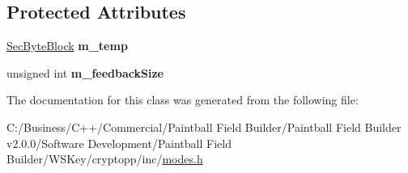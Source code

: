\subsection*{Protected Attributes}
\begin{DoxyCompactItemize}
\item 
\hypertarget{class_c_f_b___mode_policy_a3f54e6a630ed22a9fc40457a5926f18b}{
\hyperlink{class_sec_block}{SecByteBlock} {\bfseries m\_\-temp}}
\label{class_c_f_b___mode_policy_a3f54e6a630ed22a9fc40457a5926f18b}

\item 
\hypertarget{class_c_f_b___mode_policy_a39e0c7dda96bfbf8cfe7abe3709b0138}{
unsigned int {\bfseries m\_\-feedbackSize}}
\label{class_c_f_b___mode_policy_a39e0c7dda96bfbf8cfe7abe3709b0138}

\end{DoxyCompactItemize}


The documentation for this class was generated from the following file:\begin{DoxyCompactItemize}
\item 
C:/Business/C++/Commercial/Paintball Field Builder/Paintball Field Builder v2.0.0/Software Development/Paintball Field Builder/WSKey/cryptopp/inc/\hyperlink{modes_8h}{modes.h}\end{DoxyCompactItemize}
